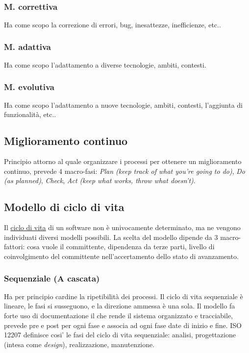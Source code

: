 		\subsubsection{M. correttiva}
		Ha come scopo la correzione di errori, bug, inesattezze, inefficienze, etc..
		
		\subsubsection{M. adattiva}
		Ha come scopo l'adattamento a diverse tecnologie, ambiti, contesti.
		
		\subsubsection{M. evolutiva}
		Ha come scopo l'adattamento a nuove tecnologie, ambiti, contesti, l'aggiunta di funzionalità, etc..

	\subsection{Miglioramento continuo}
	\label{sec:miglioramentocontinuo}
	Principio attorno al quale organizzare i processi per ottenere un miglioramento continuo, prevede 4 macro-fasi:
	\emph{Plan (keep track of what you're going to do)}, \emph{Do (as planned)}, \emph{Check}, \emph{Act (keep what works, throw what doesn't)}.
		
	\subsection{Modello di ciclo di vita}
	\label{sec:modelliciclodivita}
	Il \underline{\hyperref[sec:ciclodivita]{ciclo di vita}} di un software non è univocamente determinato, ma ne vengono individuati diversi modelli possibili. La scelta del modello dipende da 3 macro-fattori: cosa vuole il committente, dipendenza da terze parti, livello di coinvolgimento del committente nell'accertamento dello stato di avanzamento.
	
		\subsubsection{Sequenziale (A cascata)}
			Ha per principio cardine la ripetibilità dei processi.
			Il ciclo di vita sequenziale è lineare, le fasi si susseguono, e la direzione
			ammessa è una sola.
			Il modello fa forte uso di documentazione il che rende il sistema organizzato e tracciabile, prevede pre e post per ogni fase e associa ad ogni fase date di inizio e fine.  
ISO 12207 definisce cosi' le fasi del ciclo di vita sequenziale: analisi, progettazione (intesa come \textit{design}), realizzazione, manutenzione. 		
		
